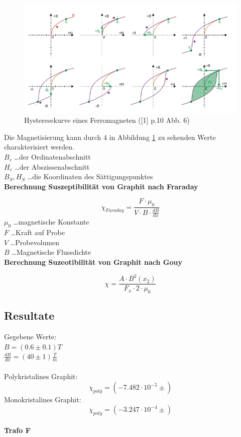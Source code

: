 \documentclass[12pt,a4paper]{article}
\begin{document}
\begin{multicols}{2}
\begin{figure}[H]
	\centering
	\includegraphics[scale=0.3]{./figures/hysterese.png}
	\caption{Hysteresekurve eines Ferromagneten ([1] p.10 Abb. 6)}
	\label{fig:hysterese}
\end{figure}

Die Magnetisierung kann durch 4 in Abbildung \ref{fig:hysterese} zu sehenden Werte charakterisiert werden.\\
$B_r$ \ldots der Ordinatenabschnitt\\
$H_c$ \ldots der Abszissenabschnitt\\
$B_S, H_S$ \ldots die Koordinaten des Sättigungspunktes\\

\textbf{Berechnung Suszeptibilität von Graphit nach Fraraday}

$$\chi_{Faraday} = \frac{F \cdot \mu_0}{V \cdot B \cdot \frac{dB}{dx}}$$
$\mu_0$ \ldots magnetische Konstante\\
$F$ \ldots Kraft auf Probe\\
$V$ \ldots Probevolumen\\
$B$ \ldots Magnetische Flussdichte\\


\textbf{Berechnung Suzeotibilität von Graphit nach Gouy}

$$\chi = \frac{A \cdot B^2(x_2)}{F_x \cdot 2 \cdot \mu_{0}} $$

\subsection{Resultate}
Gegebene Werte:\\
$B = (0.6 \pm 0.1)T$\\
$\frac{dB}{dx} = (40 \pm 1) \frac{T}{m}$\\
\\
Polykristalines Graphit:
$$\chi_{poly} = (-7.482 \cdot 10^{-5} \pm )$$
Monokristalines Graphit:
$$\chi_{poly} = (-3.247 \cdot 10^{-4} \pm )$$
\\
\textbf{Trafo F}\\


\end{multicols}
\end{document}

